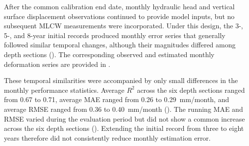 After the common calibration end date, monthly hydraulic head and vertical surface displacement observations continued to provide model inputs, but no subsequent MLCW measurements were incorporated. Under this design, the 3-, 5-, and 8-year initial records produced monthly error series that generally followed similar temporal changes, although their magnitudes differed among depth sections (). The corresponding observed and estimated monthly deformation series are provided in .

These temporal similarities were accompanied by only small differences in the monthly performance statistics. Average $R^2$ across the six depth sections ranged from 0.67 to 0.71, average MAE ranged from 0.26 to 0.29~mm/month, and average RMSE ranged from 0.36 to 0.40~mm/month (). The running MAE and RMSE varied during the evaluation period but did not show a common increase across the six depth sections (). Extending the initial record from three to eight years therefore did not consistently reduce monthly estimation error.

